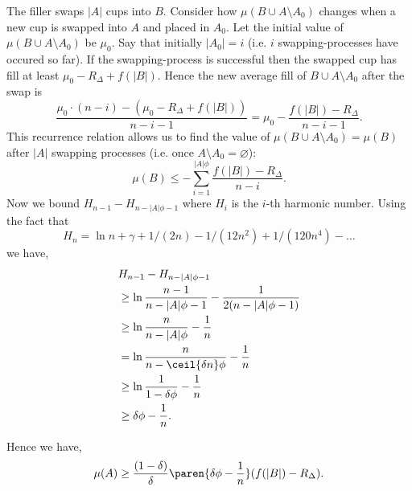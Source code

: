 {  The filler swaps $|A|$ cups into $B$. 
  Consider how $\mu(B \cup A\setminus A_0)$ changes when a new
  cup is swapped into $A$ and placed in $A_0$. Let the initial value
  of $\mu(B \cup A\setminus A_0)$ be $\mu_0$. Say that
  initially $|A_0| = i$ (i.e. $i$ swapping-processes have occured
  so far). If the swapping-process is successful then the swapped cup has
  fill at least $\mu_0 - R_\Delta + f(|B|)$. Hence the new
  average fill of $B \cup A\setminus A_0$ after the swap is
  $$\frac{\mu_0\cdot (n-i) - (\mu_0 - R_\Delta + f(|B|))}{n-i-1} =
  \mu_0 - \frac{f(|B|) - R_\Delta}{n-i-1}.$$
  This recurrence relation allows us to find the value of
  $\mu(B \cup A\setminus A_0) = \mu(B)$ after $|A|$ swapping
  processes (i.e. once $A\setminus A_0 = \varnothing$):
  $$\mu(B) \le -\sum_{i=1}^{|A|\phi} \frac{f(|B|)-R_\Delta}{n-i}.$$
  Now we bound $H_{n-1} - H_{n-|A|\phi-1}$ where $H_i$ is the $i$-th harmonic number.
  Using the fact that 
  $$H_n = \ln n + \gamma + 1/(2n) - 1/(12 n^2) + 1/(120 n^4) - \ldots$$
  we have,
  \begin{align*}
    &H_{n-1} - H_{n-|A|\phi-1}\\
  &\ge \ln \frac{n-1}{n-|A|\phi-1} - \frac{1}{2(n-|A|\phi-1)}\\
  &\ge \ln \frac{n}{n-|A|\phi} - \frac{1}{n}\\
  &= \ln \frac{n}{n-\ceil{\delta n}\phi} - \frac{1}{n}\\
  &\ge \ln \frac{1}{1-\delta\phi} - \frac{1}{n}\\
  &\ge \delta\phi - \frac{1}{n}.
  \end{align*}

  Hence we have, 
  \begin{equation}
    \label{eq:nastyobliviousamplificationlemmastep1backlog}
  \mu(A) \ge
  \frac{(1-\delta)}{\delta}\paren{\delta\phi-\frac{1}{n}}(f(|B|)-R_\Delta).
  \end{equation}




}
